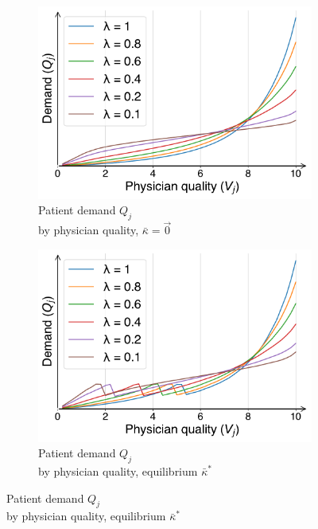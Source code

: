 \documentclass[../main.tex]{subfiles}
\begin{document}
\begin{figure}[H]
    \centering
    \begin{subfigure}[b]{0.46\linewidth}
        \centering
        \includegraphics[width=\linewidth]{Q_zero.pdf}
        \vspace{-0.6cm}
        \caption{Patient demand $Q_j$ \\ by physician quality, $\bar{\kappa} = \vec{0}$}
        \label{fig:LogitQ0}
    \end{subfigure}
    \hspace{0.05\linewidth}  %
    \begin{subfigure}[b]{0.46\linewidth}
        \centering
        \includegraphics[width=\linewidth]{Q_eq.pdf}
        \vspace{-0.6cm}
        \caption{Patient demand $Q_j$ \\ by physician quality, equilibrium $\bar{\kappa}^*$}
        \label{fig:LogitQeq}
    \end{subfigure}


\end{figure}
\end{document}
